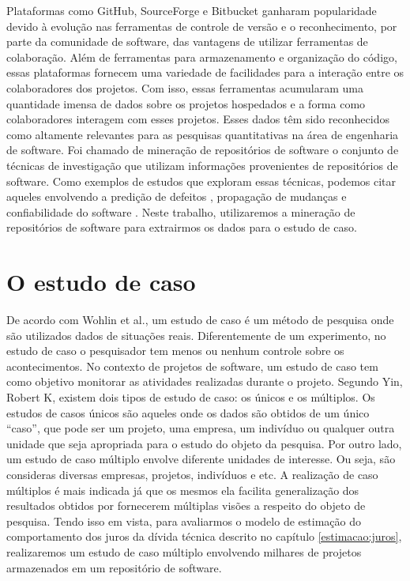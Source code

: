 Plataformas como GitHub, SourceForge e Bitbucket ganharam popularidade devido à evolução nas ferramentas de controle de versão e o reconhecimento, por parte da comunidade de software,  das vantagens de utilizar ferramentas de colaboração. Além de ferramentas para armazenamento e organização do código, essas plataformas fornecem uma variedade de facilidades para a interação entre os colaboradores dos projetos. Com isso, essas ferramentas acumularam uma quantidade imensa de dados sobre os projetos hospedados e a forma como colaboradores interagem com esses projetos. Esses dados têm sido reconhecidos como altamente relevantes para as pesquisas quantitativas na área de engenharia de software. Foi chamado de mineração de repositórios de software \cite{bai2008mining} o conjunto de técnicas de investigação que utilizam informações provenientes de repositórios de software. Como exemplos de estudos que exploram essas técnicas, podemos citar aqueles envolvendo a predição de defeitos \cite{wang2014software}, propagação de mudanças \cite{wiese2015predicting} e confiabilidade do software \cite{de2015software}. Neste trabalho, utilizaremos a mineração de repositórios de software para extrairmos os dados para o estudo de caso. 

\section{O estudo de caso}

 De acordo com Wohlin et al.\cite{wohlin2003empirical}, um estudo de caso é um método de pesquisa onde são utilizados dados de situações reais. Diferentemente de um experimento, no estudo de caso o pesquisador tem menos ou nenhum controle sobre os acontecimentos.  No contexto de projetos de software, um estudo de caso tem como objetivo monitorar as atividades realizadas durante o projeto. Segundo Yin, Robert K\cite{yin2011applications}, existem dois tipos de estudo de caso: os únicos e os múltiplos. Os estudos de casos únicos são aqueles onde os dados são obtidos de um único ``caso'',  que pode ser um projeto, uma empresa, um indivíduo ou qualquer outra unidade que seja apropriada para o estudo do objeto da pesquisa. Por outro lado, um estudo de caso múltiplo envolve diferente unidades de interesse. Ou seja, são consideras diversas empresas, projetos, indivíduos e etc. A realização de caso múltiplos é mais indicada já que os mesmos ela facilita generalização dos resultados obtidos por fornecerem múltiplas visões a respeito do objeto de pesquisa. Tendo isso em vista,  para avaliarmos o modelo de estimação do comportamento dos juros da dívida técnica descrito no capítulo \ref{estimacao:juros}, realizaremos um estudo de caso múltiplo envolvendo milhares de projetos armazenados em um repositório de software.

